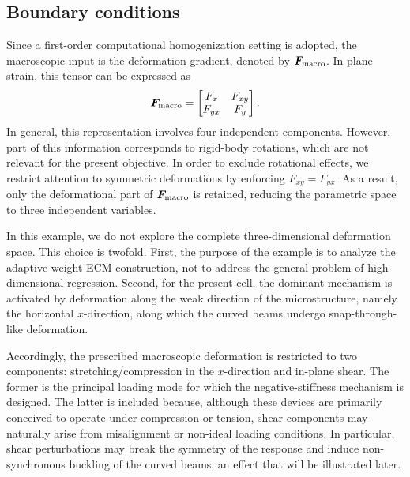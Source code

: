 \documentclass[11pt,a4paper]{article}
\newcommand{\PROMPT}[1]{ }
\begin{document}
\subsection{Boundary conditions}

\PROMPT{}



Since a first-order computational homogenization setting is adopted, the
macroscopic input is the deformation gradient, denoted by $\bm{F}_{\mathrm{macro}}$. In plane
strain, this tensor can be expressed as
\[
\bm{F}_{\mathrm{macro}}
=
\begin{bmatrix}
F_x & F_{xy} \\
F_{yx} & F_y
\end{bmatrix}.
\]
In general, this representation involves four independent components. However,
part of this information corresponds to rigid-body rotations, which are not
relevant for the present objective. In order to exclude rotational effects, we
restrict attention to symmetric deformations by enforcing $F_{xy} = F_{yx}$.
As a result, only the deformational part of $\bm{F}_{\mathrm{macro}}$ is retained, reducing the
parametric space to three independent variables.

In this example, we do not explore the complete three-dimensional deformation
space. This choice is twofold. First, the purpose of the example is to analyze
the adaptive-weight ECM construction, not to address the general problem of
high-dimensional regression. Second, for the present cell, the dominant
mechanism is activated by deformation along the weak direction of the
microstructure, namely the horizontal \(x\)-direction, along which the curved
beams undergo snap-through-like deformation.

Accordingly, the prescribed macroscopic deformation is restricted to two
components: stretching/compression in the \(x\)-direction and in-plane shear.
The former is the principal loading mode for which the negative-stiffness
mechanism is designed. The latter is included because, although these devices
are primarily conceived to operate under compression or tension, shear
components may naturally arise from misalignment or non-ideal loading
conditions. In particular, shear perturbations may break the symmetry of the
response and induce non-synchronous buckling of the curved beams, an effect that
will be illustrated later.
\end{document}
